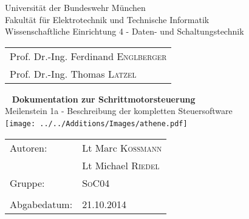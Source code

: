 \begin{titlepage}
    \thispagestyle{empty}
    \begin{center}
        \singlespacing
        {Universität der Bundeswehr München\\
        Fakultät für Elektrotechnik und Technische Informatik\\
        Wissenschaftliche Einrichtung 4 - Daten- und Schaltungstechnik}\\
        \begin{tabular}{l}
            \\
            Prof. Dr.-Ing. Ferdinand \textsc{Englberger}\\
            Prof. Dr.-Ing. Thomas \textsc{Latzel}\\
        \end{tabular}
        
        ~\vfill
        \onehalfspacing 
        \Huge{\bfseries{Dokumentation zur Schrittmotorsteuerung}}\\[0.5cm]
        
        \large{Meilenstein 1a - Beschreibung der kompletten Steuersoftware}
        \\[3cm]
        \texttt{[image: ../../Additions/Images/athene.pdf]}~
        \\[3cm]
    \end{center}
    
    \begin{center}
        \singlespacing
        \small{
        \begin{tabular}{l l}
            Autoren: & Lt Marc \textsc{Kossmann}\\
            & Lt Michael \textsc{Riedel}\\
            Gruppe: & \textsc{SoC04}\\
            \\
            Abgabedatum: & 21.10.2014\\
        \end{tabular}}
    \end{center}
\end{titlepage}
